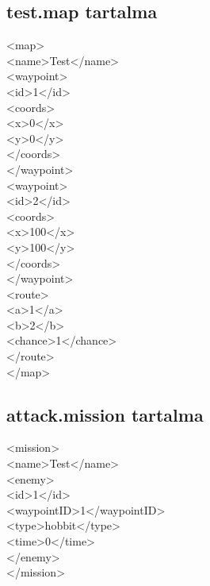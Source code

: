 \subsection{test.map tartalma}
<map>\\
\phantom{pina}<name>Test</name>\\
\phantom{pina}<waypoint>\\
\phantom{pina}\phantom{pina}<id>1</id>\\
\phantom{pina}\phantom{pina}<coords>\\
\phantom{pina}\phantom{pina}\phantom{pina}<x>0</x>\\
\phantom{pina}\phantom{pina}\phantom{pina}<y>0</y>\\
\phantom{pina}\phantom{pina}</coords>\\
\phantom{pina}</waypoint>\\
\phantom{pina}<waypoint>\\
\phantom{pina}\phantom{pina}<id>2</id>\\
\phantom{pina}\phantom{pina}<coords>\\
\phantom{pina}\phantom{pina}\phantom{pina}<x>100</x>\\
\phantom{pina}\phantom{pina}\phantom{pina}<y>100</y>\\
\phantom{pina}\phantom{pina}</coords>\\
\phantom{pina}</waypoint>\\
\phantom{pina}<route>\\
\phantom{pina}\phantom{pina}<a>1</a>\\
\phantom{pina}\phantom{pina}<b>2</b>\\
\phantom{pina}\phantom{pina}<chance>1</chance>\\
\phantom{pina}</route>\\
</map>\\

\subsection{attack.mission tartalma}
<mission>\\
\phantom{pina}<name>Test</name>\\
\phantom{pina}<enemy>\\
\phantom{pina}\phantom{pina}<id>1</id>\\
\phantom{pina}\phantom{pina}<waypointID>1</waypointID>\\
\phantom{pina}\phantom{pina}<type>hobbit</type>\\
\phantom{pina}\phantom{pina}<time>0</time>\\
\phantom{pina}</enemy>\\
</mission>\\
